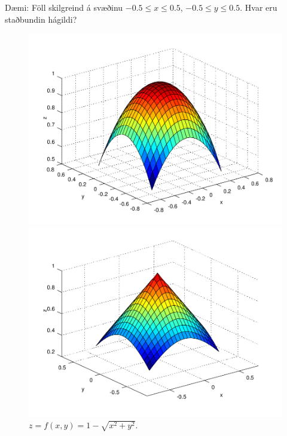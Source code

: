 \subsection{}
  Dæmi: Föll skilgreind á svæðinu $-0.5 \leq x \leq 0.5$,  $-0.5 \leq y \leq 0.5$. Hvar eru staðbundin hágildi?
  \begin{figure}[!h]
        \centering
        \begin{minipage}{.5\textwidth}
            \centering
            \includegraphics[width=.8\linewidth]{peak_smooth.png}
            \caption*{$z = f(x,y) = 1-x^2-y^2$.}
        \end{minipage}%
        \begin{minipage}{.5\textwidth}
            \centering
            \includegraphics[width=.8\linewidth]{peak.png}
            \caption*{$z = f(x,y) = 1-\sqrt{x^2+y^2}$.}
        \end{minipage}
        \begin{minipage}{.5\textwidth}
            \centering

\end{minipage}
\end{figure}
